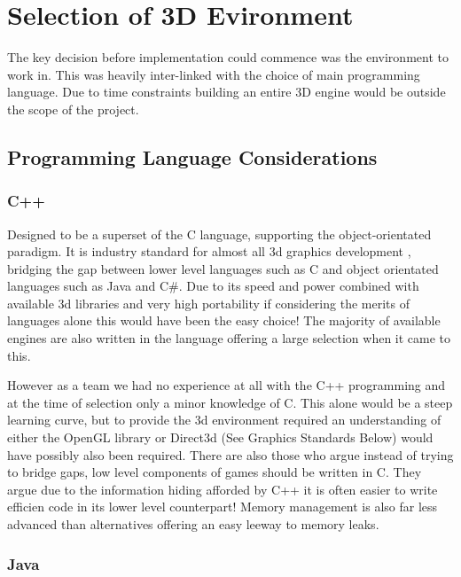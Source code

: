 
\section*{Selection of 3D Evironment}

The key decision before implementation could commence was the environment
to work in. This was heavily inter-linked with the choice of main
programming language. Due to time constraints building an entire 3D
engine would be outside the scope of the project.


\subsection*{Programming Language Considerations}


\subsubsection*{C++}

Designed to be a superset of the C language, supporting the object-orientated
paradigm. It is industry standard for almost all 3d graphics development
\cite{Wilson2006}, bridging the gap between lower level languages
such as C and object orientated languages such as Java and C\#. Due
to its speed and power combined with available 3d libraries and very
high portability if considering the merits of languages alone this
would have been the easy choice! The majority of available engines
are also written in the language offering a large selection when it
came to this.

However as a team we had no experience at all with the C++ programming
and at the time of selection only a minor knowledge of C. This alone
would be a steep learning curve, but to provide the 3d environment
required an understanding of either the OpenGL library or Direct3d
(See Graphics Standards Below) would have possibly also been required.
There are also those who argue instead of trying to bridge gaps, low
level components of games should be written in C. They argue due to
the information hiding afforded by C++ it is often easier to write
efficien code in its lower level counterpart!\cite{Wilson2006} Memory
management is also far less advanced than alternatives offering an
easy leeway to memory leaks.


\subsubsection*{Java}

